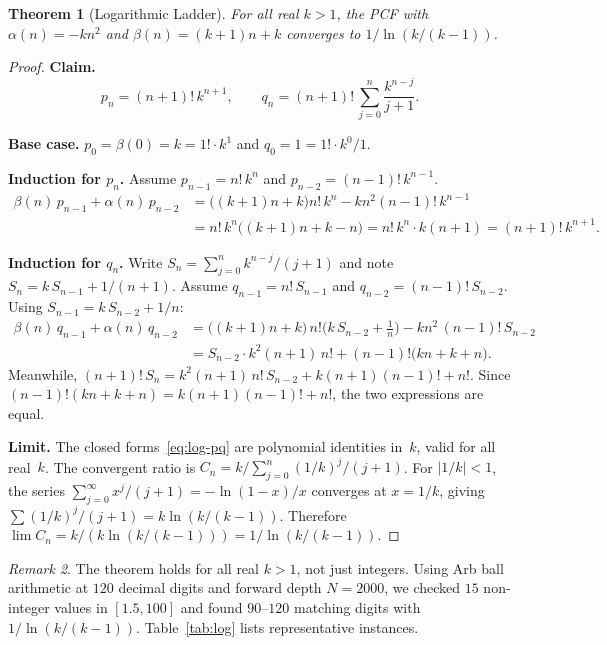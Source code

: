 \documentclass[11pt,a4paper]{article}
\theoremstyle{plain}
\newtheorem{theorem}{Theorem}[section]
\theoremstyle{definition}
\theoremstyle{remark}
\newtheorem{remark}[theorem]{Remark}
\begin{document}
\begin{theorem}[Logarithmic Ladder]\label{thm:log}
For all real $k > 1$, the PCF with
$\alpha(n) = -kn^2$ and $\beta(n) = (k{+}1)n + k$
converges to $1/\ln(k/(k{-}1))$.
\end{theorem}

\begin{proof}
\textbf{Claim.}
\begin{equation}\label{eq:log-pq}
  p_n = (n{+}1)!\, k^{n+1}, \qquad
  q_n = (n{+}1)!\, \sum_{j=0}^{n} \frac{k^{n-j}}{j+1}.
\end{equation}

\textbf{Base case.}
$p_0 = \beta(0) = k = 1!\cdot k^1$ and $q_0 = 1 = 1!\cdot k^0/1$.

\medskip\noindent\textbf{Induction for $p_n$.}
Assume $p_{n-1} = n!\,k^n$ and $p_{n-2} = (n{-}1)!\,k^{n-1}$.
\begin{align*}
  \beta(n)\,p_{n-1} + \alpha(n)\,p_{n-2}
  &= \bigl((k{+}1)n + k\bigr) n!\,k^n - kn^2 (n{-}1)!\,k^{n-1} \\
  &= n!\,k^n\bigl((k{+}1)n + k - n\bigr)
   = n!\,k^n \cdot k(n{+}1) = (n{+}1)!\,k^{n+1}.
\end{align*}

\medskip\noindent\textbf{Induction for $q_n$.}
Write $S_n = \sum_{j=0}^{n} k^{n-j}/(j{+}1)$
and note $S_n = k\,S_{n-1} + 1/(n{+}1)$.
Assume $q_{n-1} = n!\,S_{n-1}$ and $q_{n-2} = (n{-}1)!\,S_{n-2}$.
Using $S_{n-1} = k\,S_{n-2} + 1/n$:
\begin{align*}
\beta(n)\,q_{n-1} + \alpha(n)\,q_{n-2}
&= \bigl((k{+}1)n{+}k\bigr)\,n!\bigl(k\,S_{n-2}+\tfrac{1}{n}\bigr)
   - kn^2\,(n{-}1)!\,S_{n-2} \\
&= S_{n-2}\cdot k^2(n{+}1)\,n!
   + (n{-}1)!\bigl(kn+k+n\bigr).
\end{align*}
Meanwhile,
$(n{+}1)!\,S_n
= k^2(n{+}1)\,n!\,S_{n-2} + k(n{+}1)(n{-}1)! + n!$.
Since $(n{-}1)!(kn{+}k{+}n) = k(n{+}1)(n{-}1)! + n!$,
the two expressions are equal.

\medskip\noindent\textbf{Limit.}
The closed forms~\eqref{eq:log-pq} are polynomial identities in~$k$,
valid for all real~$k$.
The convergent ratio is
$C_n = k/\sum_{j=0}^{n}(1/k)^j/(j{+}1)$.
For $|1/k| < 1$, the series
$\sum_{j=0}^{\infty} x^j/(j{+}1) = -\ln(1{-}x)/x$
converges at $x = 1/k$, giving
$\sum (1/k)^j/(j{+}1) = k\ln(k/(k{-}1))$.
Therefore
$\lim C_n = k/(k\ln(k/(k{-}1))) = 1/\ln(k/(k{-}1))$.
\end{proof}

\begin{remark}
The theorem holds for all real $k > 1$, not just integers.
Using Arb ball arithmetic at $120$ decimal digits and forward depth
$N=2000$, we checked $15$ non-integer values in $[1.5,100]$ and found
$90$--$120$ matching digits with $1/\ln(k/(k{-}1))$.
Table~\ref{tab:log} lists representative instances.
\end{remark}
\end{document}
